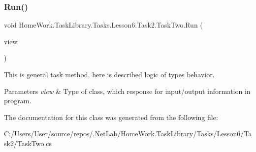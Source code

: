 \subsubsection{\texorpdfstring{Run()}{Run()}}
{\footnotesize\ttfamily void Home\+Work.\+Task\+Library.\+Tasks.\+Lesson6.\+Task2.\+Task\+Two.\+Run (\begin{DoxyParamCaption}\item[{I\+Information}]{view }\end{DoxyParamCaption})}



This is general task method, here is described logic of types behavior. 


\begin{DoxyParams}{Parameters}
{\em view} & Type of class, which response for input/output information in program.\\
\hline
\end{DoxyParams}


The documentation for this class was generated from the following file\+:\begin{DoxyCompactItemize}
\item 
C\+:/\+Users/\+User/source/repos/.\+Net\+Lab/\+Home\+Work.\+Task\+Library/\+Tasks/\+Lesson6/\+Task2/Task\+Two.\+cs\end{DoxyCompactItemize}
